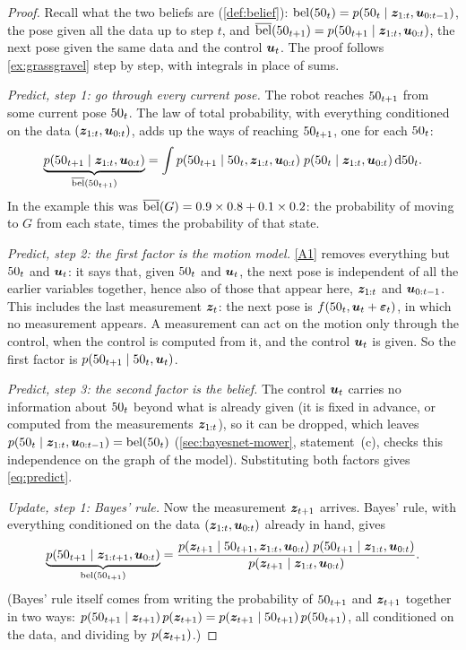 \begin{proof}
Recall what the two beliefs are (\cref{def:belief}):
$\operatorname{bel}(50_t)=p(50_t\mid\bm{z}_{1:t},\bm{u}_{0:t-1})$, the pose given all the data
up to step $t$, and $\overline{\operatorname{bel}}(50_{t+1})=p(50_{t+1}\mid\bm{z}_{1:t},\bm{u}_{0:t})$,
the next pose given the same data and the control $\bm{u}_t$. The proof
follows \cref{ex:grassgravel} step by step, with integrals in place of
sums.

\emph{Predict, step 1: go through every current pose.} The robot reaches
$50_{t+1}$ from some current pose $50_t$. The law of total probability,
with everything conditioned on the data $(\bm{z}_{1:t},\bm{u}_{0:t})$, adds up
the ways of reaching $50_{t+1}$, one for each $50_t$:
\[
  \underbrace{p(50_{t+1}\mid\bm{z}_{1:t},\bm{u}_{0:t})}_{\overline{\operatorname{bel}}(50_{t+1})}
  =\int p(50_{t+1}\mid50_t,\bm{z}_{1:t},\bm{u}_{0:t})\;
  p(50_t\mid\bm{z}_{1:t},\bm{u}_{0:t})\,\mathrm d50_t .
\]
In the example this was $\overline{\operatorname{bel}}(G)=0.9\times0.8+0.1\times0.2$: the
probability of moving to $G$ from each state, times the probability of
that state.

\emph{Predict, step 2: the first factor is the motion model.} \ref{A1}
removes everything but $50_t$ and $\bm{u}_t$: it says that, given $50_t$ and
$\bm{u}_t$, the next pose is independent of all the earlier variables
together, hence also of those that appear here, $\bm{z}_{1:t}$ and
$\bm{u}_{0:t-1}$. This includes the last measurement $\bm{z}_t$: the next pose
is $f(50_t,\bm{u}_t+\bm{\varepsilon}_t)$, in which no measurement appears. A
measurement can act on the motion only through the control, when the
control is computed from it, and the control $\bm{u}_t$ is given. So the
first factor is $p(50_{t+1}\mid50_t,\bm{u}_t)$.

\emph{Predict, step 3: the second factor is the belief.} The control
$\bm{u}_t$ carries no information about $50_t$ beyond what is already given
(it is fixed in advance, or computed from the measurements $\bm{z}_{1:t}$),
so it can be dropped, which leaves
$p(50_t\mid\bm{z}_{1:t},\bm{u}_{0:t-1})=\operatorname{bel}(50_t)$ (\cref{sec:bayesnet-mower},
statement~(c), checks this independence on the graph of the model).
Substituting both factors gives \eqref{eq:predict}.

\emph{Update, step 1: Bayes' rule.} Now the measurement $\bm{z}_{t+1}$
arrives. Bayes' rule, with everything conditioned on the data
$(\bm{z}_{1:t},\bm{u}_{0:t})$ already in hand, gives
\[
  \underbrace{p(50_{t+1}\mid\bm{z}_{1:t+1},\bm{u}_{0:t})}_{\operatorname{bel}(50_{t+1})}=
  \frac{p(\bm{z}_{t+1}\mid50_{t+1},\bm{z}_{1:t},\bm{u}_{0:t})\;
  p(50_{t+1}\mid\bm{z}_{1:t},\bm{u}_{0:t})}
  {p(\bm{z}_{t+1}\mid\bm{z}_{1:t},\bm{u}_{0:t})}.
\]
(Bayes' rule itself comes from writing the probability of $50_{t+1}$ and
$\bm{z}_{t+1}$ together in two ways: $p(50_{t+1}\mid\bm{z}_{t+1})\,p(\bm{z}_{t+1})=
p(\bm{z}_{t+1}\mid50_{t+1})\,p(50_{t+1})$, all conditioned on the data, and
dividing by $p(\bm{z}_{t+1})$.)


\end{proof}
